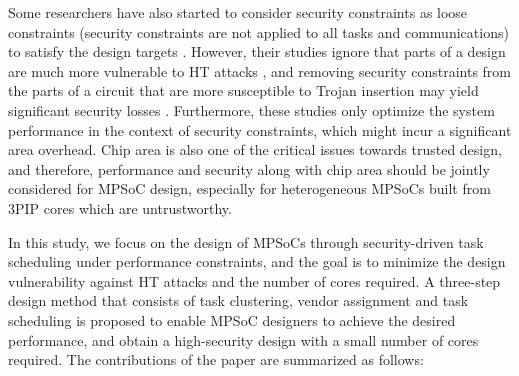 \documentclass[10pt,journal, compsoc]{IEEEtran}
\begin{document}
Some researchers have also started to consider security constraints as loose constraints (security constraints are not applied to all tasks and communications) to satisfy the design targets \cite{article:CL, article:NW, conference:NW}. However, their studies ignore that parts of a design are much more vulnerable to HT attacks \cite{conference:HS}, and removing security constraints from the parts of a circuit that are more susceptible to Trojan insertion may yield significant security losses \cite{article:XC}. Furthermore, these studies only optimize the system performance in the context of security constraints, which might incur a significant area overhead. Chip area is also one of the critical issues towards trusted design, and therefore, performance and security along with chip area should be jointly considered for MPSoC design, especially for heterogeneous MPSoCs built from 3PIP cores which are untrustworthy.



In this study, we focus on the design of MPSoCs through security-driven task scheduling under performance constraints, and the goal is to minimize the design vulnerability against HT attacks and the number of cores required. A three-step design method that consists of task clustering, vendor assignment and task scheduling is proposed to enable MPSoC designers to achieve the desired performance, and obtain a high-security design with a small number of cores required. The contributions of the paper are summarized as follows:

\end{document}
